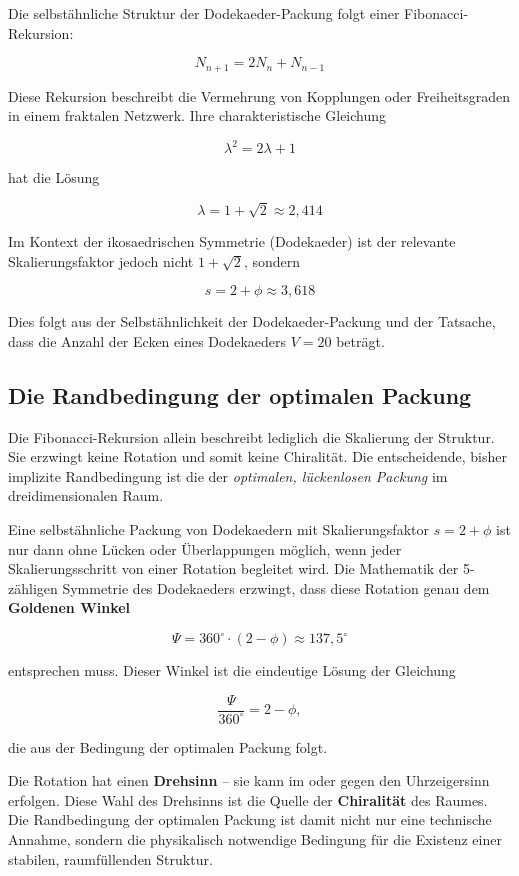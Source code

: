 Die selbstähnliche Struktur der Dodekaeder-Packung folgt einer Fibonacci-Rekursion:

\[
N_{n+1} = 2N_n + N_{n-1}
\]

Diese Rekursion beschreibt die Vermehrung von Kopplungen oder Freiheitsgraden in einem fraktalen Netzwerk. Ihre charakteristische Gleichung

\[
\lambda^2 = 2\lambda + 1
\]

hat die Lösung

\[
\lambda = 1 + \sqrt{2} \approx 2,414
\]

Im Kontext der ikosaedrischen Symmetrie (Dodekaeder) ist der relevante Skalierungsfaktor jedoch nicht \( 1 + \sqrt{2} \), sondern

\[
s = 2 + \phi \approx 3,618
\]

Dies folgt aus der Selbstähnlichkeit der Dodekaeder-Packung und der Tatsache, dass die Anzahl der Ecken eines Dodekaeders \( V = 20 \) beträgt.

\subsection{Die Randbedingung der optimalen Packung}
\label{sub:randbedingung_packung}

Die Fibonacci-Rekursion allein beschreibt lediglich die Skalierung der Struktur. Sie erzwingt keine Rotation und somit keine Chiralität. Die entscheidende, bisher implizite Randbedingung ist die der \emph{optimalen, lückenlosen Packung} im dreidimensionalen Raum.

Eine selbstähnliche Packung von Dodekaedern mit Skalierungsfaktor \(s = 2+\phi\) ist nur dann ohne Lücken oder Überlappungen möglich, wenn jeder Skalierungsschritt von einer Rotation begleitet wird. Die Mathematik der 5-zähligen Symmetrie des Dodekaeders erzwingt, dass diese Rotation genau dem \textbf{Goldenen Winkel}

\[
\Psi = 360^\circ \cdot (2 - \phi) \approx 137,5^\circ
\]

entsprechen muss. Dieser Winkel ist die eindeutige Lösung der Gleichung

\[
\frac{\Psi}{360^\circ} = 2 - \phi,
\]

die aus der Bedingung der optimalen Packung folgt.

Die Rotation hat einen \textbf{Drehsinn} – sie kann im oder gegen den Uhrzeigersinn erfolgen. Diese Wahl des Drehsinns ist die Quelle der \textbf{Chiralität} des Raumes. Die Randbedingung der optimalen Packung ist damit nicht nur eine technische Annahme, sondern die physikalisch notwendige Bedingung für die Existenz einer stabilen, raumfüllenden Struktur.

